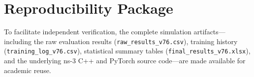 \documentclass[runningheads,a4paper]{llncs}
\begin{document}
\section*{Reproducibility Package}
To facilitate independent verification, the complete simulation artifacts---including the raw evaluation results (\texttt{raw\_results\_v76.csv}), training history (\texttt{training\_log\_v76.csv}), statistical summary tables (\texttt{final\_results\_v76.xlsx}), and the underlying ns-3 C++ and PyTorch source code---are made available for academic reuse.



\end{document}

